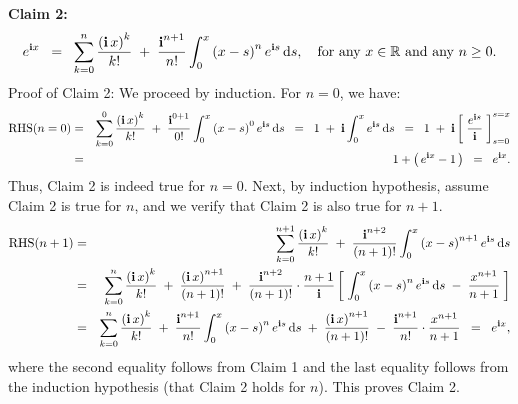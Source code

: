 \vskip 0.5cm

\begin{center}
\begin{minipage}{6.5in}
\noindent
\textbf{Claim 2:}
\begin{equation*}
e^{\textnormal{\bf i} x}
\;\;=\;\;
\sum_{k=0}^{n}\dfrac{\left(\textnormal{\bf i}\,x\right)^{k}}{k!}
\;+\; \dfrac{\textnormal{\bf i}^{n+1}}{n!}\int_{0}^{x}\left(x-s\right)^{n}e^{\textnormal{\bf i} s}\,\textnormal{d} s,
\quad
\textnormal{for any $x \in \mathbb{R}$ and any $n \geq 0$.}
\end{equation*}
Proof of Claim 2: We proceed by induction.
For $n = 0$, we have:
\begin{eqnarray*}
\textnormal{RHS}(n=0)
&=&
\sum_{k=0}^{0}\dfrac{\left(\textnormal{\bf i}\,x\right)^{k}}{k!}
\;+\; \dfrac{\textnormal{\bf i}^{0+1}}{0!}\int_{0}^{x}\left(x-s\right)^{0}e^{\textnormal{\bf i} s}\,\textnormal{d} s
\;\;=\;\; 1 \;+\; \textnormal{\bf i}\int_{0}^{x} e^{\textnormal{\bf i} s}\,\textnormal{d} s
\;\;=\;\; 1 \;+\; \textnormal{\bf i}\left[\;\dfrac{e^{\textnormal{\bf i} s}}{\textnormal{\bf i}}\;\right]_{s=0}^{s=x}
\\
&=& 1 + \left(\,e^{\textnormal{\bf i} x} - 1\,\right) \;\;=\;\; e^{\textnormal{\bf i} x}.
\end{eqnarray*}
Thus, Claim 2 is indeed true for $n = 0$.
Next, by induction hypothesis, assume Claim 2 is true for $n$,
and we verify that Claim 2 is also true for $n+1$.
\begin{eqnarray*}
\textnormal{RHS}(n+1)
&=& \sum_{k=0}^{n+1}\dfrac{\left(\textnormal{\bf i}\,x\right)^{k}}{k!} \;+\; \dfrac{\textnormal{\bf i}^{n+2}}{(n+1)!}\int_{0}^{x}\left(x-s\right)^{n+1}e^{\textnormal{\bf i} s}\,\textnormal{d} s
\\
&=&
\sum_{k=0}^{n}\dfrac{\left(\textnormal{\bf i}\,x\right)^{k}}{k!}
\;+\; \dfrac{\left(\textnormal{\bf i}\,x\right)^{n+1}}{(n+1)!}
\;+\; \dfrac{\textnormal{\bf i}^{n+2}}{(n+1)!}\cdot\dfrac{n+1}{\textnormal{\bf i}}\left[\;\int_{0}^{x}\left(x-s\right)^{n}e^{\textnormal{\bf i} s}\,\textnormal{d} s \;-\; \dfrac{x^{n+1}}{n+1} \;\right]
\\
&=& 
\sum_{k=0}^{n}\dfrac{\left(\textnormal{\bf i}\,x\right)^{k}}{k!}
\;+\; \dfrac{\textnormal{\bf i}^{n+1}}{n!}\int_{0}^{x}\left(x-s\right)^{n}e^{\textnormal{\bf i} s}\,\textnormal{d} s
\;+\; \dfrac{\left(\textnormal{\bf i}\,x\right)^{n+1}}{(n+1)!}
\;-\; \dfrac{\textnormal{\bf i}^{n+1}}{n!}\cdot\dfrac{x^{n+1}}{n+1}
\;\;=\;\; e^{\textnormal{\bf i} x},
\end{eqnarray*}
where the second equality follows from Claim 1 and the last equality follows from the induction hypothesis (that Claim 2 holds for $n$).
This proves Claim 2.
\end{minipage}
\end{center}

\vskip 0.5cm

